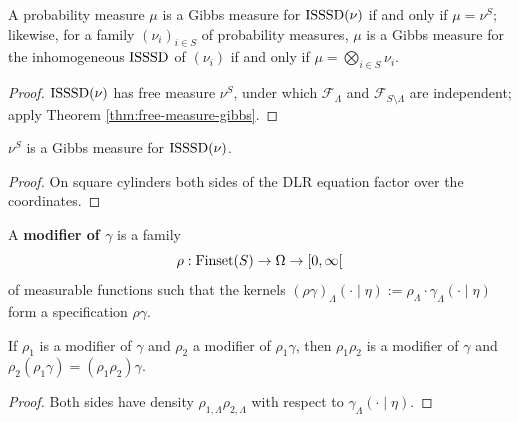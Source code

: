 \begin{lemma}
    \label{lem:isssd-gibbs-meas-uniqueness}
    \leanok

    A probability measure $\mu$ is a Gibbs measure for $\operatorname{ISSSD}(\nu)$ if and only if
    $\mu = \nu^S$; likewise, for a family $(\nu_i)_{i \in S}$ of probability measures, $\mu$ is a
    Gibbs measure for the inhomogeneous $\operatorname{ISSSD}$ of $(\nu_i)$ if and only if
    $\mu = \bigotimes_{i \in S} \nu_i$.
\end{lemma}
\begin{proof}
    \leanok

    $\operatorname{ISSSD}(\nu)$ has free measure $\nu^S$, under which $\mathcal{F}_\Lambda$ and
    $\mathcal{F}_{S \setminus \Lambda}$ are independent; apply
    Theorem \ref{thm:free-measure-gibbs}.
\end{proof}

\begin{lemma}
    \label{lem:isssd-gibbs-meas-existence}
    \leanok{}

    $\nu^S$ is a Gibbs measure for $\operatorname{ISSSD}(\nu)$.
\end{lemma}
\begin{proof}

    On square cylinders both sides of the DLR equation factor over the coordinates.
\end{proof}

\begin{definition}[Modifier]
    \label{def:modif}
    \leanok{}

    A {\bf modifier of $\gamma$} is a family
    \[\rho : \operatorname{Finset}(S) \to \Omega \to [0, \infty[\]
    of measurable functions such that the kernels
    $(\rho\gamma)_\Lambda(\cdot \mid \eta) := \rho_\Lambda \cdot \gamma_\Lambda(\cdot \mid \eta)$
    form a specification $\rho\gamma$.
\end{definition}

\begin{lemma}
    \label{lem:modif-modif}
    \leanok{}

    If $\rho_1$ is a modifier of $\gamma$ and $\rho_2$ a modifier of $\rho_1\gamma$, then
    $\rho_1\rho_2$ is a modifier of $\gamma$ and $\rho_2(\rho_1\gamma) = (\rho_1\rho_2)\gamma$.
\end{lemma}
\begin{proof}
    \leanok

    Both sides have density $\rho_{1,\Lambda}\rho_{2,\Lambda}$ with respect to
    $\gamma_\Lambda(\cdot\mid\eta)$.
\end{proof}

